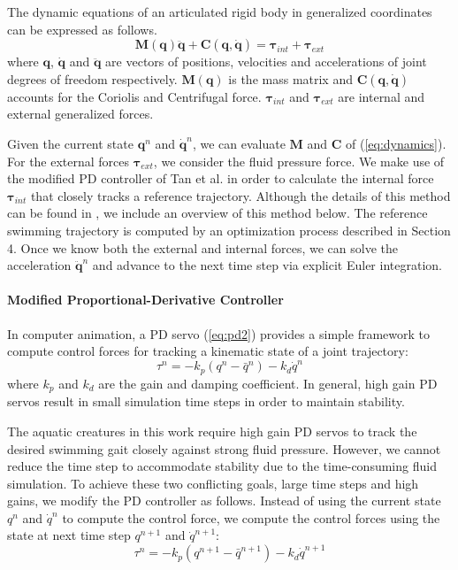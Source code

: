 The dynamic equations of an articulated rigid body in generalized coordinates can be expressed as follows.
\begin{equation}
\label{eq:dynamics}
\mathbf{M}(\mathbf{q})\mathbf{\ddot{q}}+\mathbf{C}(\mathbf{q},\mathbf{\dot{q}})=\mathbf{\tau}_{int}+\mathbf{\tau}_{ext}
\end{equation}
where $\mathbf{q}$, $\mathbf{\dot{q}}$ and $\mathbf{\ddot{q}}$ are vectors of positions, velocities and accelerations of joint degrees of freedom respectively. $\mathbf{M}(\mathbf{q})$ is the mass matrix and $\mathbf{C}(\mathbf{q},\mathbf{\dot{q}})$ accounts for the Coriolis and Centrifugal force. $\mathbf{\tau}_{int}$ and $\mathbf{\tau}_{ext}$ are internal and external generalized forces.

Given the current state $\mathbf{q}^n$ and $\mathbf{\dot{q}}^n$, we can
evaluate $\mathbf{M}$ and $\mathbf{C}$ of (\ref{eq:dynamics}). For the
external forces $\mathbf{\tau}_{ext}$, we consider the
fluid pressure force. We make use of the modified PD controller of Tan et al. \cite{Tan11SPD} in order to calculate the internal force $\mathbf{\tau}_{int}$ that closely tracks a reference trajectory. Although the details of this method can be found in \cite{Tan11SPD}, we include an overview of this method below. The reference swimming trajectory is computed by an optimization
process described in Section 4. Once we know both the external and
internal forces, we can solve the acceleration $\mathbf{\ddot{q}}^n$ and
advance to the next time step via explicit Euler integration.

\paragraph {Modified Proportional-Derivative Controller} In computer
animation, a PD servo (\ref{eq:pd2}) provides a simple framework to
compute control forces for tracking a kinematic state of a joint
trajectory:
\begin{equation}
\label{eq:pd2}
\tau^n=-k_p(q^n-\bar{q}^n)-k_d\dot{q}^n
\end{equation}
where $k_p$ and $k_d$ are the gain and damping coefficient. In general,
high gain PD servos result in small simulation time steps in order to
maintain stability.

The aquatic creatures in this work require high gain PD servos to track the desired swimming gait closely against strong fluid pressure. However, we cannot reduce the time step to accommodate stability due to the time-consuming fluid simulation. To achieve these two conflicting goals, large time steps and high gains, we modify the PD controller as follows. Instead of using the current state $q^n$ and $\dot{q}^n$ to compute the control force, we compute the control forces using the state at next time step $q^{n+1}$ and $\dot{q}^{n+1}$:
\begin{equation} \label{eq:pd3}
\tau^n=-k_p(q^{n+1}-\bar{q}^{n+1})-k_d\dot{q}^{n+1}
\end{equation}

